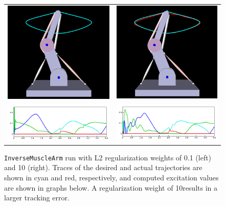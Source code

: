 \begin{figure}[ht]
\begin{center}
\begin{tabular}{cc}
   \else
      \includegraphics[width=3.25in]{images/InverseMuscleArmL2_reg}&
      \includegraphics[width=3.23in]{images/InverseMuscleArmL2_10}\\
      \includegraphics[width=3.25in]{images/InverseMuscleArmExL2_reg}&
      \includegraphics[width=3.23in]{images/InverseMuscleArmExL2_10}
   \fi
\end{tabular}
\end{center}
\caption{{\tt InverseMuscleArm} run with L2 regularization weights of 0.1
(left) and 10 (right). Traces of the desired and actual trajectories are shown
in cyan and red, respectively, and computed excitation values are shown in
graphs below.  A regularization weight of 10results in a larger tracking
error.}
\label{InverseMuscleArmL2:fig}
\end{figure}

